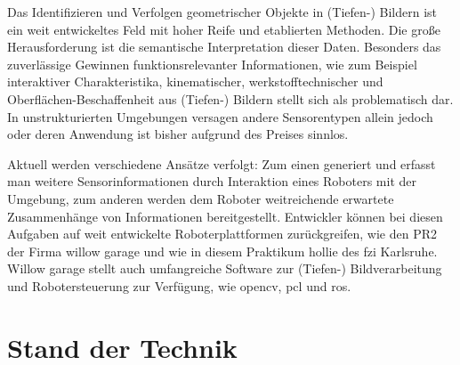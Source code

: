 Das Identifizieren und Verfolgen geometrischer Objekte in (Tiefen-) Bildern ist ein weit entwickeltes Feld mit hoher Reife und etablierten Methoden.
 Die große Herausforderung ist die semantische Interpretation dieser Daten. Besonders das zuverlässige Gewinnen funktionsrelevanter Informationen,
 wie zum Beispiel interaktiver Charakteristika, kinematischer, werkstofftechnischer und  Oberflächen-Beschaffenheit aus (Tiefen-) Bildern stellt sich
 als problematisch dar. In unstrukturierten Umgebungen versagen andere Sensorentypen allein jedoch oder deren Anwendung ist bisher aufgrund des Preises sinnlos.
 
Aktuell werden verschiedene Ansätze verfolgt: Zum einen generiert und erfasst man weitere Sensorinformationen durch Interaktion eines Roboters mit der Umgebung,
 zum anderen werden dem Roboter weitreichende erwartete Zusammenhänge von Informationen bereitgestellt. Entwickler können bei diesen Aufgaben auf weit entwickelte Roboterplattformen
 zurückgreifen, wie den PR2 der Firma willow garage und wie in diesem Praktikum
 \gls{hollie} des \gls{fzi} Karlsruhe. Willow garage stellt auch umfangreiche
 Software zur (Tiefen-) Bildverarbeitung und Robotersteuerung zur Verfügung,
 wie \gls{opencv}, \gls{pcl} und \gls{ros}.

\section{Stand der Technik}
\label{stand_der_technik_sec}
\authorsection{\editordummy}

